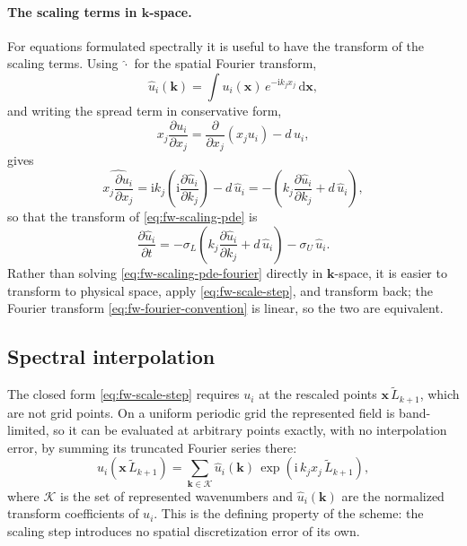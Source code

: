 \paragraph{The scaling terms in \texorpdfstring{$\mathbf{k}$}{k}-space.}
For equations formulated spectrally it is useful to have the transform of the
scaling terms. Using $\widehat{\cdot}$ for the spatial Fourier transform,
\begin{equation}\label{eq:fw-fourier-convention}
  \hat{u}_i(\mathbf{k}) = \int u_i(\mathbf{x})\, e^{-\mathrm{i} k_j x_j}\, \mathrm{d}\mathbf{x},
\end{equation}
and writing the spread term in conservative form,
\begin{equation}\label{eq:fw-scaling-divform}
  x_j \frac{\partial u_i}{\partial x_j}
  = \frac{\partial}{\partial x_j}\left( x_j u_i \right) - d\, u_i,
\end{equation}
gives
\begin{equation}\label{eq:fw-fourier-scaling}
  \widehat{x_j \frac{\partial u_i}{\partial x_j}}
  = \mathrm{i} k_j \left( \mathrm{i} \frac{\partial \hat{u}_i}{\partial k_j} \right) - d\, \hat{u}_i
  = -\left( k_j \frac{\partial \hat{u}_i}{\partial k_j} + d\, \hat{u}_i \right),
\end{equation}
so that the transform of \eqref{eq:fw-scaling-pde} is
\begin{equation}\label{eq:fw-scaling-pde-fourier}
  \frac{\partial \hat{u}_i}{\partial t}
  = -\sigma_L \left( k_j \frac{\partial \hat{u}_i}{\partial k_j} + d\, \hat{u}_i \right)
  - \sigma_U\, \hat{u}_i .
\end{equation}
Rather than solving \eqref{eq:fw-scaling-pde-fourier} directly in
$\mathbf{k}$-space, it is easier to transform to physical space, apply
\eqref{eq:fw-scale-step}, and transform back; the Fourier transform
\eqref{eq:fw-fourier-convention} is linear, so the two are equivalent.

\subsection{Spectral interpolation}\label{ssec:fw-interpolation}

The closed form \eqref{eq:fw-scale-step} requires $u_i$ at the rescaled points
$\mathbf{x}\,\tilde{L}_{k+1}$, which are not grid points. On a uniform
periodic grid the represented field is band-limited, so it can be evaluated at
arbitrary points exactly, with no interpolation error, by summing its
truncated Fourier series there:
\begin{equation}\label{eq:fw-spectral-interp}
  u_i\!\left(\mathbf{x}\, \tilde{L}_{k+1}\right)
  = \sum_{\mathbf{k} \in \mathcal{K}} \hat{u}_i(\mathbf{k})\,
    \exp\!\left( \mathrm{i}\, k_j x_j\, \tilde{L}_{k+1} \right),
\end{equation}
where $\mathcal{K}$ is the set of represented wavenumbers and
$\hat{u}_i(\mathbf{k})$ are the normalized transform coefficients of $u_i$.
This is the defining property of the scheme: the scaling step introduces no
spatial discretization error of its own.

